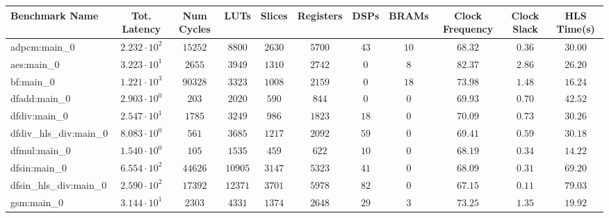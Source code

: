 \begin{tabular}{|l|c|c|c|c|c|c|c|c|c|c|}
\hline
Benchmark Name          & Tot. Latency           & Num Cycles & LUTs      & Slices    & Registers & DSPs    & BRAMs   & Clock Frequency & Clock Slack & HLS Time(s) \\
\hline
adpcm:main\_0           & $ 2.232 \cdot 10^{2} $ & $ 15252  $ & $ 8800  $ & $ 2630  $ & $ 5700  $ & $ 43  $ & $ 10  $ & $ 68.32       $ & $ 0.36    $ & $ 30.00   $ \\
aes:main\_0             & $ 3.223 \cdot 10^{1} $ & $ 2655   $ & $ 3949  $ & $ 1310  $ & $ 2742  $ & $ 0   $ & $ 8   $ & $ 82.37       $ & $ 2.86    $ & $ 26.20   $ \\
bf:main\_0              & $ 1.221 \cdot 10^{3} $ & $ 90328  $ & $ 3323  $ & $ 1008  $ & $ 2159  $ & $ 0   $ & $ 18  $ & $ 73.98       $ & $ 1.48    $ & $ 16.24   $ \\
dfadd:main\_0           & $ 2.903 \cdot 10^{0} $ & $ 203    $ & $ 2020  $ & $ 590   $ & $ 844   $ & $ 0   $ & $ 0   $ & $ 69.93       $ & $ 0.70    $ & $ 42.52   $ \\
dfdiv:main\_0           & $ 2.547 \cdot 10^{1} $ & $ 1785   $ & $ 3249  $ & $ 986   $ & $ 1823  $ & $ 18  $ & $ 0   $ & $ 70.09       $ & $ 0.73    $ & $ 30.26   $ \\
dfdiv\_hls\_div:main\_0 & $ 8.083 \cdot 10^{0} $ & $ 561    $ & $ 3685  $ & $ 1217  $ & $ 2092  $ & $ 59  $ & $ 0   $ & $ 69.41       $ & $ 0.59    $ & $ 30.18   $ \\
dfmul:main\_0           & $ 1.540 \cdot 10^{0} $ & $ 105    $ & $ 1535  $ & $ 459   $ & $ 622   $ & $ 10  $ & $ 0   $ & $ 68.19       $ & $ 0.34    $ & $ 14.22   $ \\
dfsin:main\_0           & $ 6.554 \cdot 10^{2} $ & $ 44626  $ & $ 10905 $ & $ 3147  $ & $ 5323  $ & $ 41  $ & $ 0   $ & $ 68.09       $ & $ 0.31    $ & $ 69.20   $ \\
dfsin\_hls\_div:main\_0 & $ 2.590 \cdot 10^{2} $ & $ 17392  $ & $ 12371 $ & $ 3701  $ & $ 5978  $ & $ 82  $ & $ 0   $ & $ 67.15       $ & $ 0.11    $ & $ 79.03   $ \\
gsm:main\_0             & $ 3.144 \cdot 10^{1} $ & $ 2303   $ & $ 4331  $ & $ 1374  $ & $ 2648  $ & $ 29  $ & $ 3   $ & $ 73.25       $ & $ 1.35    $ & $ 19.92   $ \\

\end{tabular}
